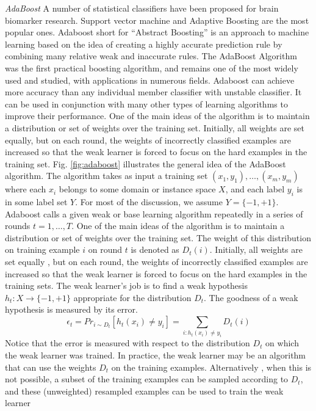\documentclass[authoryear,preprint,revi	ew,12pt]{elsarticle}
\begin{document}
\textit{AdaBoost}
A number of statistical classifiers have been proposed for brain biomarker research. Support vector machine and Adaptive Boosting are the most popular ones. Adaboost short for ``Abstract Boosting'' is an approach to machine learning based on the idea of creating a highly accurate prediction rule by combining many relative weak and inaccurate rules. The AdaBoost Algorithm \citep{freund1996experiments} was the first practical boosting algorithm, and remains one of the most widely used and studied, with applications in numerous fields. Adaboost can achieve more accuracy than any individual member classifier with unstable classifier. It can be used in conjunction with many other types of learning algorithms to improve their performance. One of the main ideas of the algorithm is to maintain a distribution or set of weights over the training set.  Initially, all weights are set equally, but on each round, the weights of incorrectly classified examples are increased so that the weak learner is forced to focus on the hard examples in the training set. Fig. \ref{fig:adaboost} illustrates the general idea of the AdaBoost algorithm. The algorithm takes as input a training set $ (x_1,y_1), \dots , (x_m,y_m) $ where each $ x_i $ belongs to some domain or instance space $ X $, and each label $ y_i $ is in some label set $ Y $. For most of the discussion, we assume $ Y = \{-1, +1\} $. Adaboost calls a given weak or base learning  algorithm repeatedly in a series of rounds $ t = 1,\dots,T $. One of the main ideas of the algorithm is to maintain a distribution or set of weights over the training set. The weight of this distribution on training example $ i $ on round $ t $ is denoted as $ D_t(i) $. Initially, all weights are set equally , but on each round, the weights of incorrectly classified examples are increased so that the weak learner is forced to focus on the hard examples in the training sets.
The weak learner's job is to find a weak hypothesis $ h_t : X \to \{-1 ,+1\}$ appropriate for the distribution $ D_t $. The goodness of a weak hypothesis is measured by its error.
$$ \epsilon_t = Pr_{i \sim D_t}[h_t(x_i) \neq y_i] = \underset{i:h_t(x_i) \neq y_i}{\sum} D_t(i)  $$
Notice that the error is measured with respect to the distribution $ D_t $ on which the weak learner was trained. In practice, the weak learner may be an algorithm that can use the weights $ D_t $ on the training examples. Alternatively , when this is not possible, a subset of the training examples can be sampled according to $ D_t $, and these (unweighted) resampled examples can be used to train the weak learner~\cite{schapire2013explaining}
\end{document}

